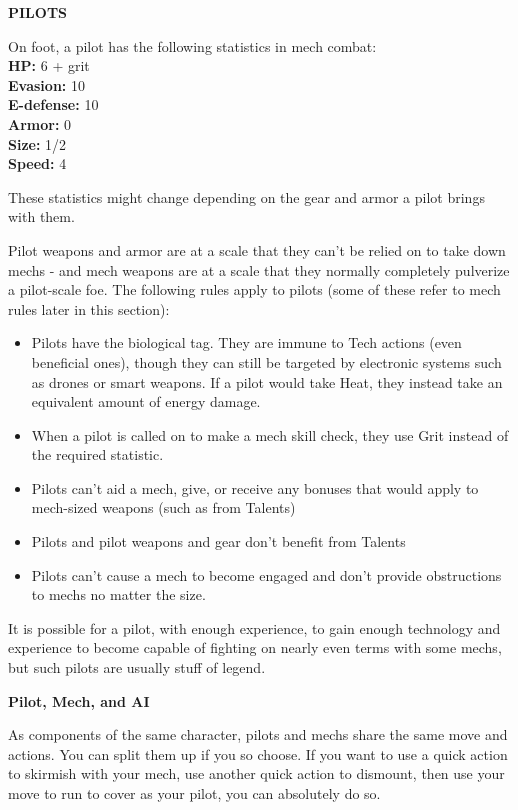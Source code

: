 \begin{center}
    \textbf{PILOTS}    
\end{center}
On foot, a pilot has the following statistics in mech combat:\\
\quad\quad\textbf{HP:} 6 + grit\\
\quad\quad\textbf{Evasion:} 10\\
\quad\quad\textbf{E-defense:} 10\\
\quad\quad\textbf{Armor:} 0\\
\quad\quad\textbf{Size:} 1/2\\
\quad\quad\textbf{Speed:} 4

These statistics might change depending on the gear and armor a pilot brings with them.

Pilot weapons and armor are at a scale that they can’t be relied on to take down mechs - and mech weapons are at a scale that they normally completely pulverize a pilot-scale foe. The following rules apply to pilots (some of these refer to mech rules later in this section):
\begin{itemize}
\item Pilots have the biological tag. They are immune to Tech actions (even beneficial ones), though they can still be targeted by electronic systems such as drones or smart weapons. If a pilot would take Heat, they instead take an equivalent amount of energy damage.
\item When a pilot is called on to make a mech skill check, they use Grit instead of the required statistic.
\item Pilots can’t aid a mech, give, or receive any bonuses that would apply to mech-sized weapons (such as from Talents)
\item Pilots and pilot weapons and gear don’t benefit from Talents
\item Pilots can’t cause a mech to become engaged and don’t provide obstructions to mechs no matter the size.
\end{itemize}

It is possible for a pilot, with enough experience, to gain enough technology and experience to become capable of fighting on nearly even terms with some mechs, but such pilots are usually stuff of legend.

\begin{center}
    \textbf{Pilot, Mech, and AI}    
\end{center}

As components of the same character, pilots and mechs share the same move and actions. You can split them up if you so choose. If you want to use a quick action to skirmish with your mech, use another quick action to dismount, then use your move to run to cover as your pilot, you can absolutely do so.

